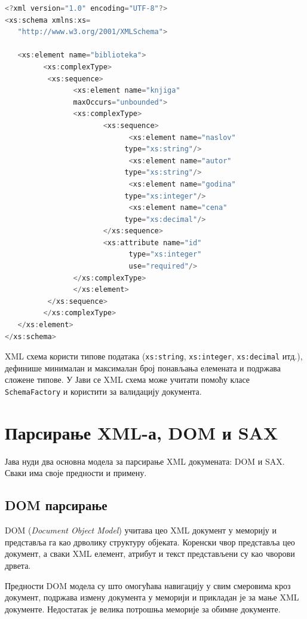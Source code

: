 \begin{lstlisting}[language=Java]
<?xml version="1.0" encoding="UTF-8"?>
<xs:schema xmlns:xs=
   "http://www.w3.org/2001/XMLSchema">
 
   <xs:element name="biblioteka">
         <xs:complexType>
          <xs:sequence>
                <xs:element name="knjiga"
                maxOccurs="unbounded">
                <xs:complexType>
                       <xs:sequence>
                             <xs:element name="naslov"
                            type="xs:string"/>
                             <xs:element name="autor"
                            type="xs:string"/>
                             <xs:element name="godina"
                            type="xs:integer"/>
                             <xs:element name="cena"
                            type="xs:decimal"/>
                       </xs:sequence>
                       <xs:attribute name="id"
                             type="xs:integer"
                             use="required"/>
                </xs:complexType>
                </xs:element>
          </xs:sequence>
         </xs:complexType>
   </xs:element>
</xs:schema>
\end{lstlisting}


XML схема користи типове података (\texttt{xs:string}, \texttt{xs:integer}, \texttt{xs:decimal} итд.), дефинише минималан и максималан број понављања елемената и подржава сложене типове. У Јави се XML схема може учитати помоћу класе \texttt{SchemaFactory} и користити за валидацију документа.


\section{Парсирање XML-а, DOM и SAX}

Јава нуди два основна модела за парсирање XML докумената: DOM и SAX. Сваки има своје предности и примену.


\subsection{DOM парсирање}

DOM (\textit{Document Object Model}) учитава цео XML документ у меморију и представља га као дрволику структуру објеката. Коренски чвор представља цео документ, а сваки XML елемент, атрибут и текст представљени су као чворови дрвета.

Предности DOM модела су што омогућава навигацију у свим смеровима кроз документ, подржава измену документа у меморији и прикладан је за мање XML документе. Недостатак је велика потрошња меморије за обимне документе.


